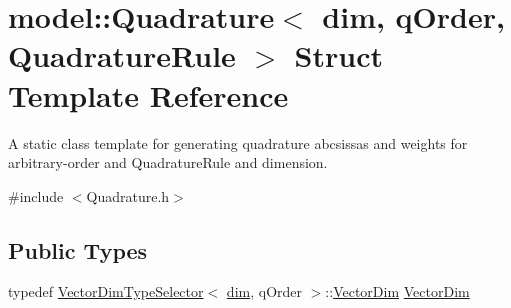 \hypertarget{structmodel_1_1_quadrature}{}\section{model\+:\+:Quadrature$<$ dim, q\+Order, Quadrature\+Rule $>$ Struct Template Reference}
\label{structmodel_1_1_quadrature}


A static class template for generating quadrature abcsissas and weights for arbitrary-\/order and Quadrature\+Rule and dimension.  




{\ttfamily \#include $<$Quadrature.\+h$>$}

\subsection*{Public Types}
\begin{DoxyCompactItemize}
\item 
typedef \hyperlink{structmodel_1_1_vector_dim_type_selector}{Vector\+Dim\+Type\+Selector}$<$ \hyperlink{plot_nd_a_8m_a382f3ca768b275b8d563604f7fc7df73}{dim}, q\+Order $>$\+::\hyperlink{structmodel_1_1_quadrature_af457aed3f503be1010dee155c33f7ec1}{Vector\+Dim} \hyperlink{structmodel_1_1_quadrature_af457aed3f503be1010dee155c33f7ec1}{Vector\+Dim}
\end{DoxyCompactItemize}
